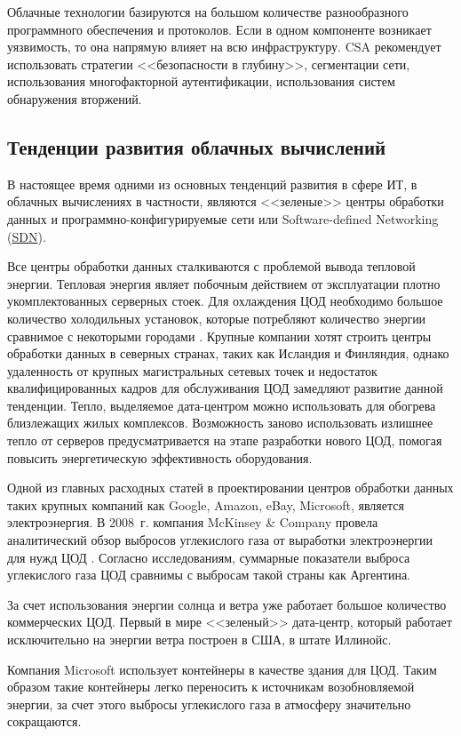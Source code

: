 Облачные технологии базируются на большом количестве разнообразного программного обеспечения и протоколов.
Если в одном компоненте возникает уязвимость, то она напрямую влияет на всю инфраструктуру.
CSA рекомендует использовать стратегии <<безопасности в глубину>>, сегментации сети, использования многофакторной аутентификации, использования систем обнаружения вторжений.

\subsection{Тенденции развития облачных вычислений}

В настоящее время одними из основных тенденций развития в сфере ИТ, в облачных вычислениях в частности, являются <<зеленые>> центры обработки данных и программно-конфигурируемые сети или Software-defined Networking (\hyperlink{sdn}{SDN}).

Все центры обработки данных сталкиваются с проблемой вывода тепловой энергии.
Тепловая энергия являет побочным действием от эксплуатации плотно укомплектованных серверных стоек.
Для охлаждения ЦОД необходимо большое количество холодильных установок, которые потребляют количество энергии сравнимое с некоторыми городами \cite{cnewsdc}.
Крупные компании хотят строить центры обработки данных в северных странах, таких как Исландия и Финляндия, однако удаленность от крупных магистральных сетевых точек и недостаток квалифицированных кадров для обслуживания ЦОД замедляют развитие данной тенденции.
Тепло, выделяемое дата-центром можно использовать для обогрева близлежащих жилых комплексов.
Возможность заново использовать излишнее тепло от серверов предусматривается на этапе разработки нового ЦОД, помогая повысить энергетическую эффективность оборудования.

Одной из главных расходных статей в проектировании центров обработки данных таких крупных компаний как Google, Amazon, eBay, Microsoft, является электроэнергия.
В 2008~г. компания McKinsey \& Company провела аналитический обзор выбросов углекислого газа от выработки электроэнергии для нужд ЦОД \cite{greendc}.
Согласно исследованиям, суммарные показатели выброса углекислого газа ЦОД сравнимы с выбросам такой страны как Аргентина.

За счет использования энергии солнца и ветра уже работает большое количество коммерческих ЦОД.
Первый в мире <<зеленый>> дата-центр, который работает исключительно на энергии ветра построен в США, в штате Иллинойс.

Компания Microsoft использует контейнеры в качестве здания для ЦОД.
Таким образом такие контейнеры легко переносить к источникам возобновляемой энергии, за счет этого выбросы углекислого газа в атмосферу значительно сокращаются.


